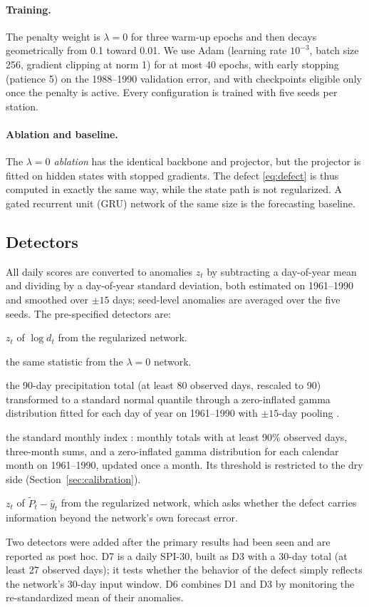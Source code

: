 \documentclass[pdflatex,sn-mathphys-ay]{sn-jnl}
\theoremstyle{thmstyletwo}
\begin{document}
\paragraph{Training.} The penalty weight is $\lambda=0$ for three warm-up epochs and then decays
geometrically from 0.1 toward 0.01. We use Adam (learning rate $10^{-3}$, batch size 256, gradient
clipping at norm 1) for at most 40 epochs, with early stopping (patience 5) on the 1988--1990 validation
error, and with checkpoints eligible only once the penalty is active. Every configuration is trained
with five seeds per station.

\paragraph{Ablation and baseline.} The \emph{$\lambda=0$ ablation} has the identical backbone and
projector, but the projector is fitted on hidden states with stopped gradients. The defect
\eqref{eq:defect} is thus computed in exactly the same way, while the state path is not regularized.
A gated recurrent unit (GRU) network \citep{cho2014} of the same size is the forecasting baseline.

\subsection{Detectors}\label{sec:detectors}
All daily scores are converted to anomalies $z_t$ by subtracting a day-of-year mean and dividing by a
day-of-year standard deviation, both estimated on 1961--1990 and smoothed over $\pm15$ days;
seed-level anomalies are averaged over the five seeds. The pre-specified detectors are:
\begin{description}[leftmargin=1.2em,itemsep=2pt]
\item[D1, regularized defect:] $z_t$ of $\log d_t$ from the regularized network.
\item[D2, ablation defect:] the same statistic from the $\lambda=0$ network.
\item[D3, daily SPI-90:] the 90-day precipitation total (at least 80 observed days, rescaled to 90)
transformed to a standard normal quantile through a zero-inflated gamma distribution fitted for each
day of year on 1961--1990 with $\pm15$-day pooling \citep{stagge2015}.
\item[D4, SPI-3:] the standard monthly index \citep{mckee1993,wmo2012}: monthly totals with at least
90\% observed days, three-month sums, and a zero-inflated gamma distribution for each calendar month on
1961--1990, updated once a month. Its threshold is restricted to the dry side
(Section~\ref{sec:calibration}).
\item[D5, forecast residual:] $z_t$ of $\tilde P_t-\hat y_t$ from the regularized network, which asks
whether the defect carries information beyond the network's own forecast error.
\end{description}
Two detectors were added after the primary results had been seen and are reported as post hoc. D7 is a
daily SPI-30, built as D3 with a 30-day total (at least 27 observed days); it tests whether the
behavior of the defect simply reflects the network's 30-day input window. D6 combines D1 and D3 by
monitoring the re-standardized mean of their anomalies.
\end{document}
